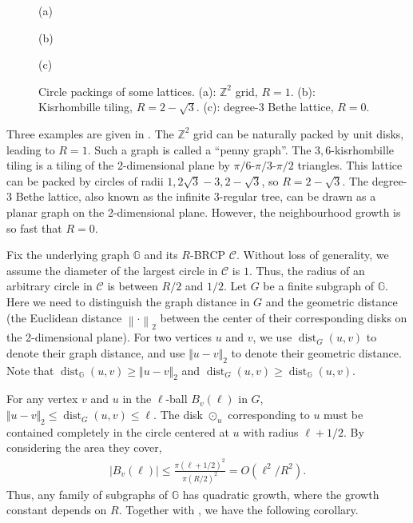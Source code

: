 \documentclass{theoretics}
\def\+#1{\mathcal{#1}}
\def\=#1{\mathbb{#1}}
\newcommand{\norm}[2]{\ensuremath{\Vert #2 \Vert_{#1}}}
\newcommand{\abs}[1]{\ensuremath{\left\vert#1\right\vert}}
\newcommand{\dist}{\operatorname{dist}}
\begin{document}
\begin{figure}
\begin{minipage}{0.32\textwidth}
{\begin{tikzpicture}
\end{tikzpicture}
}
\end{minipage}
\par
\begin{minipage}{0.32\textwidth}
\centering
\bigskip(a)
\end{minipage}
\begin{minipage}{0.32\textwidth}
\centering
\bigskip(b)
\end{minipage}
\begin{minipage}{0.32\textwidth}
\centering
\bigskip(c)
\end{minipage}

\caption{Circle packings of some lattices. (a): $\mathbb{Z}^2$ grid, $R=1$. (b): Kisrhombille tiling, $R=2-\sqrt{3}$. (c): degree-$3$ Bethe lattice, $R=0$.}
\label{fig:packing}
\end{figure}


Three examples are given in . 
The $\mathbb{Z}^2$ grid can be naturally packed by unit disks, leading to $R=1$. 
Such a graph is called a ``penny graph''. 
The $3,6$-kisrhombille tiling is a tiling of the 2-dimensional plane by $\pi/6$-$\pi/3$-$\pi/2$ triangles. 
This lattice can be packed by circles of radii $1,2\sqrt{3}-3,2-\sqrt{3}$, so $R=2-\sqrt{3}$. 
The degree-$3$ Bethe lattice, also known as the infinite $3$-regular tree, can be drawn as a planar graph on the 2-dimensional plane. 
However, the neighbourhood growth is so fast that %
$R=0$. 

Fix the underlying graph $\mathbb{G}$ and its $R$-BRCP $\mathcal{C}$. 
Without loss of generality, we assume the diameter of the largest circle in $\+C$ is $1$.
Thus, the radius of an arbitrary circle in $\+C$ is between $R/2$ and $1/2$.
Let $G$ be a finite subgraph of $\=G$.
Here we need to distinguish the graph distance in $G$ and the geometric distance (the Euclidean distance $\left\|\cdot\right\|_2$ between the center of their corresponding disks on the 2-dimensional plane).
For two vertices $u$ and $v$,
we use $\dist_G(u,v)$ to denote their graph distance,
and use $\norm{2}{u-v}$ to denote their geometric distance.
Note that $\dist_{\=G}(u,v)\ge\norm{2}{u-v}$ and $\dist_{G}(u,v)\ge\dist_{\=G}(u,v)$.

For any vertex $v$ and $u$ in the $\ell$-ball $B_v(\ell)$ in $G$,
$\norm{2}{u-v}\le\dist_G(u,v)\le \ell$.
The disk $\odot_u$ corresponding to $u$ must be contained completely in the circle centered at $u$ with radius $\ell+1/2$.
By considering the area they cover, 
\begin{align*}
  \abs{B_v(\ell)}\le \frac{\pi(\ell+1/2)^2}{\pi (R/2)^2} = O(\ell^2/R^2).
\end{align*}
Thus, any family of subgraphs of $\=G$ has quadratic growth,
where the growth constant depends on $R$.
Together with , we have the following corollary.
\end{document}
